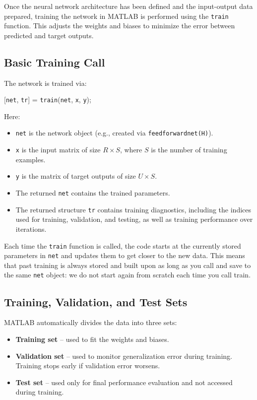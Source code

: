 \documentclass[a4paper,12pt]{article}
\newcommand{\code}[1]{\texttt{#1}}
\begin{document}
Once the neural network architecture has been defined and the input-output data prepared, training the network in MATLAB is performed using the \code{train} function. This adjusts the weights and biases to minimize the error between predicted and target outputs.

\subsection{Basic Training Call}

The network is trained via:

[\code{net}, \code{tr}] = \code{train}(\code{net}, \code{x}, \code{y});

Here:
\begin{itemize}
  \item \code{net} is the network object (e.g., created via \code{feedforwardnet(H)}).
  \item \code{x} is the input matrix of size \( R \times S \), where \( S \) is the number of training examples.
  \item \code{y} is the matrix of target outputs of size \( U \times S \).
  \item The returned \code{net} contains the trained parameters.
  \item The returned structure \code{tr} contains training diagnostics, including the indices used for training, validation, and testing, as well as training performance over iterations.
\end{itemize}

Each time the \code{train} function is called, the code starts at the currently stored parameters in \code{net} and updates them to get closer to the new data. This means that past training is always stored and built upon as long as you call and save to the same \code{net} object: we do not start again from scratch each time you call train. 

\subsection{Training, Validation, and Test Sets}

MATLAB automatically divides the data into three sets:
\begin{itemize}
  \item \textbf{Training set} – used to fit the weights and biases.
  \item \textbf{Validation set} – used to monitor generalization error during training. Training stops early if validation error worsens.
  \item \textbf{Test set} – used only for final performance evaluation and not accessed during training.
\end{itemize}
\end{document}
